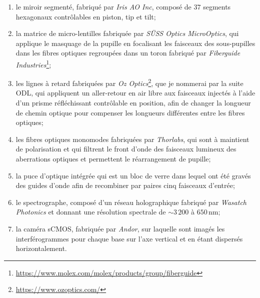 \begin{enumerate}
    \item le miroir segmenté, fabriqué par \textit{Iris AO Inc}, composé de $37$ segments hexagonaux contrôlables en piston, tip et tilt;
    \item la matrice de micro-lentilles fabriquée par \textit{SÜSS Optics MicroOptics}, qui applique le masquage de la pupille en focalisant les faisceaux des sous-pupilles dans les fibres optiques regroupées dans un toron fabriqué par \textit{Fiberguide Industries}\footnote{\url{https://www.molex.com/molex/products/group/fiberguide}};
    \item les lignes à retard fabriquées par \textit{Oz Optics}\footnote{\url{https://www.ozoptics.com/}}, que je nommerai par la suite \ac{ODL}, qui appliquent un aller-retour en air libre aux faisceaux injectés à l'aide d'un prisme réfléchissant contrôlable en position, afin de changer la longueur de chemin optique pour compenser les longueurs différentes entre les fibres optiques;
    \item les fibres optiques monomodes fabriquées par \textit{Thorlabs}, qui sont à maintient de polarisation et qui filtrent le front d'onde des faisceaux lumineux des aberrations optiques et permettent le réarrangement de pupille;
    \item la puce d'optique intégrée qui est un bloc de verre dans lequel ont été gravés des guides d'onde afin de recombiner par paires cinq faisceaux d'entrée;
    \item le spectrographe, composé d'un réseau holographique fabriqué par \textit{Wasatch Photonics} et donnant une résolution spectrale de $\sim 3\,200$ à $650 \,$nm;
    \item la caméra sCMOS, fabriquée par \textit{Andor}, sur laquelle sont imagés les interférogrammes pour chaque base sur l'axe vertical et en étant dispersés horizontalement.
\end{enumerate}

